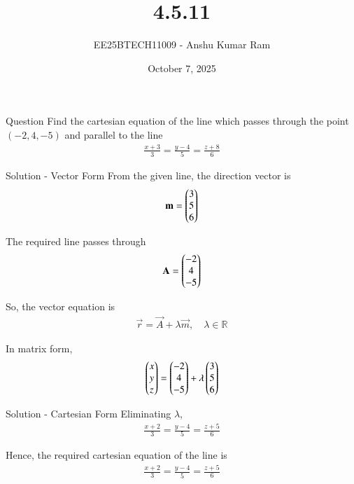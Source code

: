 \documentclass{beamer}
\title{4.5.11}
\date{October 7, 2025}
\author{EE25BTECH11009 - Anshu Kumar Ram}
\begin{document}
\frame{\titlepage}

\begin{frame}{Question}
Find the cartesian equation of the line which passes through the point $(-2,4,-5)$
and parallel to the line 
\begin{align}
\frac{x+3}{3} = \frac{y-4}{5} = \frac{z+8}{6}
\end{align}
\end{frame}

\begin{frame}{Solution - Vector Form}
From the given line, the direction vector is
\begin{align}
\mathbf{m} = \begin{pmatrix}3 \\ 5 \\ 6\end{pmatrix}
\end{align}

The required line passes through
\begin{align}
\mathbf{A} = \begin{pmatrix}-2 \\ 4 \\ -5\end{pmatrix}
\end{align}

So, the vector equation is
\begin{align}
\vec{r} = \vec{A} + \lambda \vec{m}, \quad \lambda \in \mathbb{R}
\end{align}

In matrix form,
\begin{align}
\begin{pmatrix}x \\ y \\ z\end{pmatrix} = \begin{pmatrix}-2 \\ 4 \\ -5\end{pmatrix} + \lambda \begin{pmatrix}3 \\ 5 \\ 6\end{pmatrix}
\end{align}
\end{frame}

\begin{frame}{Solution - Cartesian Form}
Eliminating $\lambda$,
\begin{align}
\frac{x+2}{3} = \frac{y-4}{5} = \frac{z+5}{6}
\end{align}

Hence, the required cartesian equation of the line is
\begin{align}
\boxed{\;\frac{x+2}{3} = \frac{y-4}{5} = \frac{z+5}{6}\;}
\end{align}
\end{frame}
\end{document}
